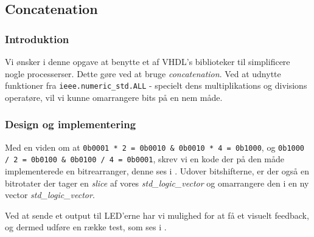

\subsection{Concatenation}

\subsubsection{Introduktion}
Vi ønsker i denne opgave at benytte et af VHDL's biblioteker til simplificere nogle processerser. Dette gøre ved at bruge \textit{concatenation}. Ved at udnytte funktioner fra \texttt{ieee.numeric\_std.ALL} - specielt dens multiplikations og divisions operatøre, vil vi kunne omarrangere bits på en nem måde.
\subsubsection{Design og implementering}


Med en viden om at \texttt{0b0001 * 2 = 0b0010 \& 0b0010 * 4 = 0b1000}, og \texttt{0b1000 / 2 = 0b0100 \& 0b0100 / 4 = 0b0001}, skrev vi en kode der på den måde implementerede en bitrearranger, denne ses i . Udover bitshifterne, er der også en bitrotater der tager en \textit{slice} af vores \textit{std\_logic\_vector} og omarrangere den i en ny vector \textit{std\_logic\_vector}.



Ved at sende et output til LED'erne har vi mulighed for at få et visuelt feedback, og dermed udføre en række test, som ses i .





